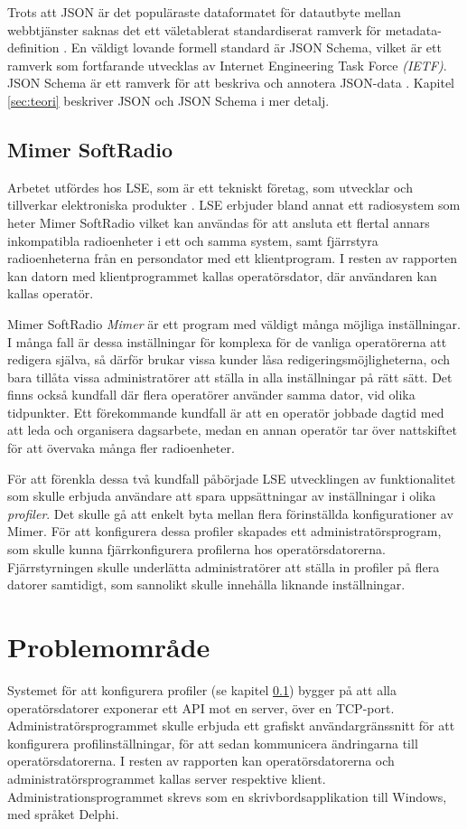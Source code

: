Trots att JSON är det populäraste dataformatet för datautbyte mellan webbtjänster saknas det ett väletablerat standardiserat ramverk för metadata-definition \cite{Pezoa2016}. En väldigt lovande formell standard är JSON Schema, vilket är ett ramverk som fortfarande utvecklas av Internet Engineering Task Force \textit{(IETF)}. JSON Schema är ett ramverk för att beskriva och annotera JSON-data \cite{A.Wright}. Kapitel \ref{sec:teori} beskriver JSON och JSON Schema i mer detalj.

\subsection{Mimer SoftRadio}
\label{sec:intro:mimer}
Arbetet utfördes hos LSE, som är ett tekniskt företag, som utvecklar och tillverkar elektroniska produkter \cite{Ehne}. LSE erbjuder bland annat ett radiosystem som heter Mimer SoftRadio vilket kan användas för att ansluta ett flertal annars inkompatibla radioenheter i ett och samma system, samt fjärrstyra radioenheterna från en persondator med ett klientprogram. I resten av rapporten kan datorn med klientprogrammet kallas operatörsdator, där användaren kan kallas operatör.

Mimer SoftRadio \textit{Mimer} är ett program med väldigt många möjliga inställningar. I många fall är dessa inställningar för komplexa för de vanliga operatörerna att redigera själva, så därför brukar vissa kunder låsa redigeringsmöjligheterna, och bara tillåta vissa administratörer att ställa in alla inställningar på rätt sätt. Det finns också kundfall där flera operatörer använder samma dator, vid olika tidpunkter. Ett förekommande kundfall är att en operatör jobbade dagtid med att leda och organisera dagsarbete, medan en annan operatör tar över nattskiftet för att övervaka många fler radioenheter.

För att förenkla dessa två kundfall påbörjade LSE utvecklingen av funktionalitet som skulle erbjuda användare att spara uppsättningar av inställningar i olika \textit{profiler}. Det skulle gå att enkelt byta mellan flera förinställda konfigurationer av Mimer. För att konfigurera dessa profiler skapades ett administratörsprogram, som skulle kunna fjärrkonfigurera profilerna hos operatörsdatorerna. Fjärrstyrningen skulle underlätta administratörer att ställa in profiler på flera datorer samtidigt, som sannolikt skulle innehålla liknande inställningar.

\section{Problemområde}
\label{sec:intro:problemområde}
Systemet för att konfigurera profiler (se kapitel \ref{sec:intro:mimer}) bygger på att alla operatörsdatorer exponerar ett API mot en server, över en TCP-port. Administratörsprogrammet skulle erbjuda ett grafiskt användargränssnitt för att konfigurera profilinställningar, för att sedan kommunicera ändringarna till operatörsdatorerna. I resten av rapporten kan operatörsdatorerna och administratörsprogrammet kallas server respektive klient. Administrationsprogrammet skrevs som en skrivbordsapplikation till Windows, med språket Delphi.

